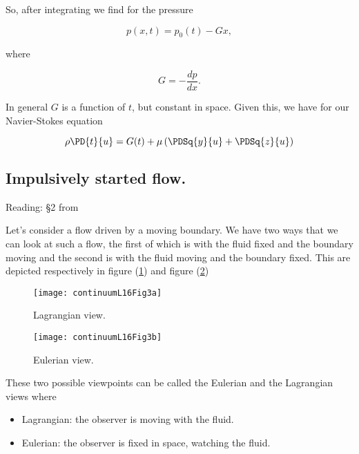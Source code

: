 So, after integrating we find for the pressure

\begin{equation}\label{eqn:continuumL16:170}
p(x, t) = p_0(t) - G x,
\end{equation}

where

\begin{equation}\label{eqn:continuumL16:190}
G = -\frac{dp}{dx}.
\end{equation}

In general $G$ is a function of $t$, but constant in space.  Given this, we have for our Navier-Stokes equation

\begin{equation}\label{eqn:continuumL16:210}
\rho \PD{t}{u} = G(t) + \mu \left( \PDSq{y}{u} +\PDSq{z}{u} \right)
\end{equation}

\subsection{Impulsively started flow.}

Reading: \S 2 from \cite{acheson1990elementary}

Let's consider a flow driven by a moving boundary.  We have two ways that we can look at such a flow, the first of which is with the fluid fixed and the boundary moving and the second is with the fluid moving and the boundary fixed.  This are depicted respectively in figure (\ref{fig:continuumL16:continuumL16Fig3a}) and figure (\ref{fig:continuumL16:continuumL16Fig3b})

\begin{figure}[htp]
   \centering
   \texttt{[image: continuumL16Fig3a]}
   \caption{Lagrangian view.}\label{fig:continuumL16:continuumL16Fig3a}
\end{figure}
\begin{figure}[htp]
   \centering
   \texttt{[image: continuumL16Fig3b]}
   \caption{Eulerian view.}\label{fig:continuumL16:continuumL16Fig3b}
\end{figure}

These two possible viewpoints can be called the Eulerian and the Lagrangian views where

\begin{itemize}
\item Lagrangian: the observer is moving with the fluid.
\item Eulerian: the observer is fixed in space, watching the fluid.
\end{itemize}

